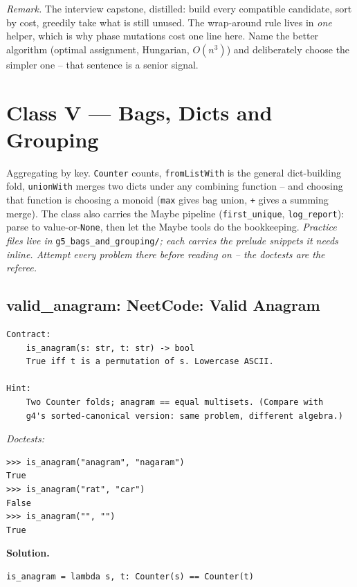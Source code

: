 \documentclass[11pt,letterpaper]{book}
\begin{document}
\noindent\textit{Remark.} The interview capstone, distilled: build every
compatible candidate, sort by cost, greedily take what is still unused. The
wrap-around rule lives in \emph{one} helper, which is why phase mutations cost
one line here. Name the better algorithm (optimal assignment, Hungarian,
$O(n^3)$) and deliberately choose the simpler one -- that sentence is a senior
signal.
\chapter{Class V --- Bags, Dicts and Grouping}

Aggregating by key. \texttt{Counter} counts, \texttt{fromListWith} is the
general dict-building fold, \texttt{unionWith} merges two dicts under any
combining function -- and choosing that function is choosing a monoid
(\texttt{max} gives bag union, \texttt{+} gives a summing merge). The class
also carries the Maybe pipeline (\texttt{first\_unique}, \texttt{log\_report}):
parse to value-or-\texttt{None}, then let the Maybe tools do the bookkeeping.
\medskip\noindent\textit{Practice files live in }\texttt{g5\_bags\_and\_grouping/}\textit{;
each carries the prelude snippets it needs inline. Attempt every problem there
before reading on -- the doctests are the referee.}

\section{valid\_anagram: NeetCode: Valid Anagram}
\begin{lstlisting}[style=spec]
Contract:
    is_anagram(s: str, t: str) -> bool
    True iff t is a permutation of s. Lowercase ASCII.

Hint:
    Two Counter folds; anagram == equal multisets. (Compare with
    g4's sorted-canonical version: same problem, different algebra.)
\end{lstlisting}
\noindent\textit{Doctests:}
\begin{lstlisting}[style=spec]
>>> is_anagram("anagram", "nagaram")
True
>>> is_anagram("rat", "car")
False
>>> is_anagram("", "")
True
\end{lstlisting}
\noindent\textbf{Solution.}
\begin{lstlisting}[style=code]
is_anagram = lambda s, t: Counter(s) == Counter(t)
\end{lstlisting}
\end{document}
